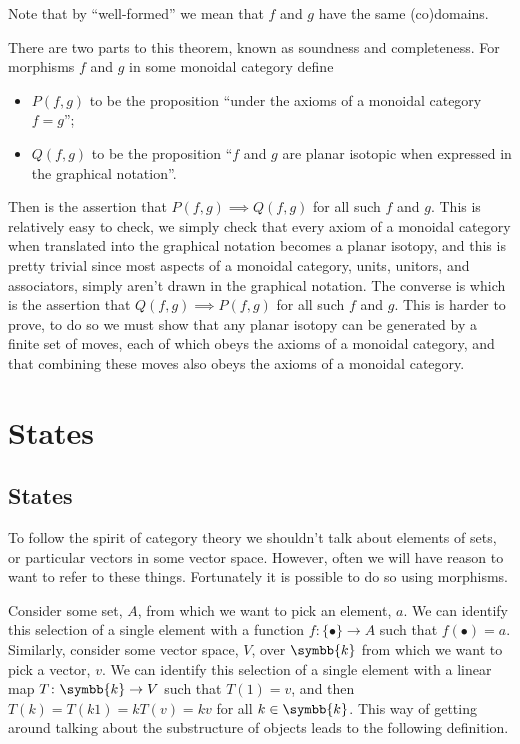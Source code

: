 \documentclass[fleqn]{NotesClass}
\renewcommand{\field}{\symbb{k}}
\begin{document}
    Note that by \enquote{well-formed} we mean that \(f\) and \(g\) have the same (co)domains.
    
    There are two parts to this theorem, known as soundness and completeness.
    For morphisms \(f\) and \(g\) in some monoidal category define
    \begin{itemize}
        \item \(P(f, g)\) to be the proposition \enquote{under the axioms of a monoidal category \(f = g\)};
        \item \(Q(f, g)\) to be the proposition \enquote{\(f\) and \(g\) are planar isotopic when expressed in the graphical notation}.
    \end{itemize}
    Then  is the assertion that \(P(f, g) \implies Q(f, g)\) for all such \(f\) and \(g\).
    This is relatively easy to check, we simply check that every axiom of a monoidal category when translated into the graphical notation becomes a planar isotopy, and this is pretty trivial since most aspects of a monoidal category, units, unitors, and associators, simply aren't drawn in the graphical notation.
    The converse is  which is the assertion that \(Q(f, g) \implies P(f, g)\) for all such \(f\) and \(g\).
    This is harder to prove, to do so we must show that any planar isotopy can be generated by a finite set of moves, each of which obeys the axioms of a monoidal category, and that combining these moves also obeys the axioms of a monoidal category.
    
    \section{States}
    \subsection{States}
    To follow the spirit of category theory we shouldn't talk about elements of sets, or particular vectors in some vector space.
    However, often we will have reason to want to refer to these things.
    Fortunately it is possible to do so using morphisms.
    
    Consider some set, \(A\), from which we want to pick an element, \(a\).
    We can identify this selection of a single element with a function \(f\colon\{\bullet\} \to A\) such that \(f(\bullet) = a\).
    Similarly, consider some vector space, \(V\), over \(\field\) from which we want to pick a vector, \(v\).
    We can identify this selection of a single element with a linear map \(T \colon \field \to V\) such that \(T(1) = v\), and then \(T(k) = T(k1) = kT(v) = kv\) for all \(k \in \field\).
    This way of getting around talking about the substructure of objects leads to the following definition.
    
\end{document}
